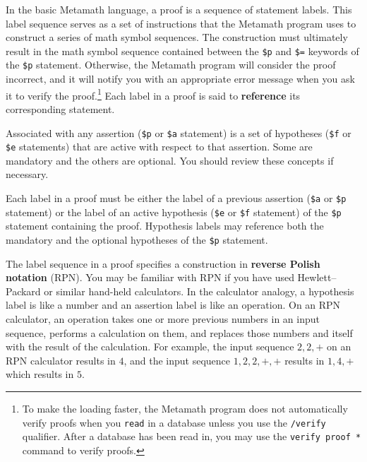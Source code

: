 In the basic Metamath language, a proof is a
sequence of statement labels.  This label sequence
serves as a set of instructions that the Metamath program uses to
construct a series of math symbol sequences.  The construction must
ultimately result in the math symbol sequence contained between the
\texttt{\$p} and
\texttt{\$=} keywords of the \texttt{\$p}
statement.  Otherwise, the Metamath program will consider the proof
incorrect, and it will notify you with an appropriate error message when
you ask it to verify the proof.\footnote{To make the loading faster, the
Metamath program does not automatically verify proofs when you
\texttt{read} in a database unless you use the \texttt{/verify}
qualifier.  After a database has been read in, you may use the
\texttt{verify proof *} command to verify proofs.} Each label in a proof is said to {\bf
reference} its corresponding statement.

Associated with any assertion (\texttt{\$p} or
\texttt{\$a} statement) is a set of
hypotheses (\texttt{\$f} or
\texttt{\$e} statements) that are active
with respect to that assertion.  Some are mandatory and the others are
optional.  You should review these concepts if necessary.

Each label in a proof must be either the label of a
previous assertion (\texttt{\$a} or
\texttt{\$p} statement) or the label of an
active hypothesis (\texttt{\$e} or \texttt{\$f} statement) of the \texttt{\$p} statement containing the
proof.  Hypothesis labels may reference both the
mandatory and the optional hypotheses of the
\texttt{\$p} statement.

The label sequence in a proof specifies a construction in {\bf reverse Polish
notation} (RPN).  You may be familiar
with RPN if you have used Hewlett--Packard or similar hand-held calculators.
In the calculator analogy, a hypothesis label is like
a number and an assertion label is like an operation.
On an RPN calculator, an operation takes one or more previous numbers in an
input sequence, performs a calculation on them, and replaces those numbers and
itself with the result of the calculation.  For example, the input sequence
$2,2,+$ on an RPN calculator results in $4$, and the input sequence
$1,2,2,+,+$ results in $1,4,+$ which results in $5$.

